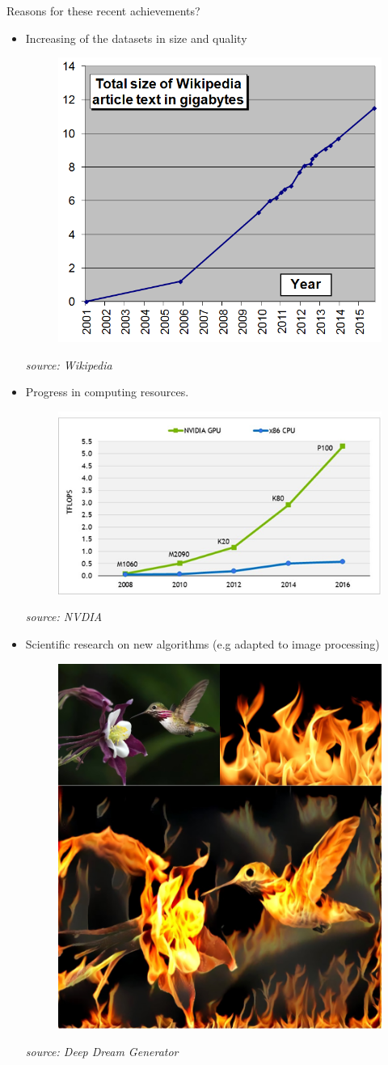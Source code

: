 \documentclass[handout]{beamer}
\newcommand{\rref}[1][]{\hfill{\scriptsize\textit{#1}}}
\begin{document}
\begin{frame}[t]{Reasons for these recent achievements?}
    \begin{itemize}
        \item Increasing of the datasets in size and quality
         {
        \begin{figure}
\includegraphics[width=.6\textwidth]{fig/L1/Wikipedia_article_size_in_gigabytes.png}
\end{figure}
\rref[source: Wikipedia]
}
        \item <2-> Progress in computing resources.
         {
        \begin{figure}
\includegraphics[width=.7\textwidth]{fig/L1/evolution-gpu.png}
\end{figure}
\rref[source: NVDIA]
}        
        
        \item <3-> Scientific research on new algorithms (e.g adapted to image processing)
                 {
        \begin{figure}
\includegraphics[width=.4\textwidth]{fig/L1/deep-art.jpg}
\end{figure}
\rref[source: Deep Dream Generator]

}        
    \end{itemize}

\end{frame}
\end{document}
